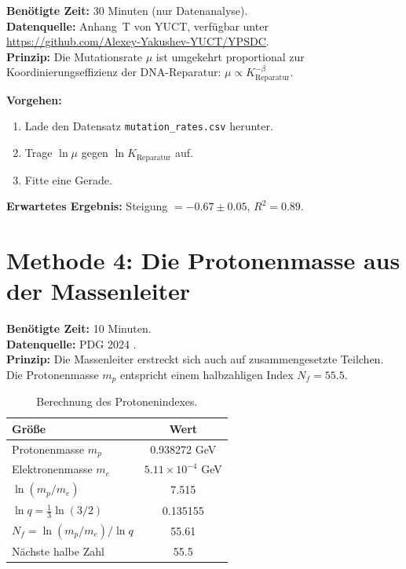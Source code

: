 \documentclass[12pt,a4paper]{article}
\begin{document}
	\textbf{Benötigte Zeit:} 30 Minuten (nur Datenanalyse).\\
	\textbf{Datenquelle:} Anhang~T von YUCT, verfügbar unter
	\url{https://github.com/Alexey-Yakushev-YUCT/YPSDC}.\\
	\textbf{Prinzip:} Die Mutationsrate \(\mu\) ist umgekehrt proportional zur
	Koordinierungseffizienz der DNA-Reparatur: \(\mu \propto K_{\text{Reparatur}}^{-\beta}\).
	
	\textbf{Vorgehen:}
	\begin{enumerate}[label=(\arabic*)]
		\item Lade den Datensatz \texttt{mutation\_rates.csv} herunter.
		\item Trage \(\ln \mu\) gegen \(\ln K_{\text{Reparatur}}\) auf.
		\item Fitte eine Gerade.
	\end{enumerate}
	
	\textbf{Erwartetes Ergebnis:} Steigung \(= -0.67 \pm 0.05\), \(R^2 = 0.89\).
	
	\section{Methode 4: Die Protonenmasse aus der Massenleiter}
	\label{sec:proton}
	
	\textbf{Benötigte Zeit:} 10 Minuten.\\
	\textbf{Datenquelle:} PDG 2024 \cite{PDG2024}.\\
	\textbf{Prinzip:} Die Massenleiter erstreckt sich auch auf zusammengesetzte Teilchen.
	Die Protonenmasse \(m_p\) entspricht einem halbzahligen Index
	\(N_f = 55.5\).
	
	\begin{table}[H]
		\centering
		\caption{Berechnung des Protonenindexes.}
		\label{tab:proton}
		\begin{tabular}{l c}
			\toprule
			Größe & Wert \\
			\midrule
			Protonenmasse \(m_p\) & 0.938272 GeV \\
			Elektronenmasse \(m_e\) & \(5.11\times10^{-4}\) GeV \\
			\(\ln(m_p/m_e)\) & 7.515 \\
			\(\ln q = \frac{1}{3}\ln(3/2)\) & 0.135155 \\
			\(N_f = \ln(m_p/m_e)/\ln q\) & 55.61 \\
			Nächste halbe Zahl & 55.5 \\
			\bottomrule
		\end{tabular}
	\end{table}
	
\end{document}
